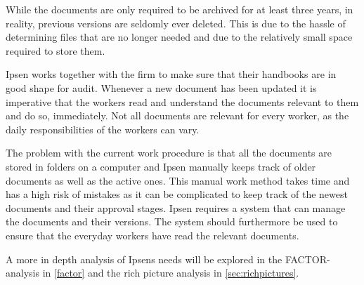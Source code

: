While the documents are only required to be archived for at least three years, in reality, previous versions are seldomly ever deleted.
This is due to the hassle of determining files that are no longer needed and due to the relatively small space required to store them.

Ipsen works together with the firm to make sure that their handbooks are in good shape for audit.
Whenever a new document has been updated it is imperative that the workers read and understand the documents relevant to them and do so, immediately.
Not all documents are relevant for every worker, as the daily responsibilities of the workers can vary.

The problem with the current work procedure is that all the documents are stored in folders on a computer and Ipsen manually keeps track of older documents as well as the active ones.
This manual work method takes time and has a high risk of mistakes as it can be complicated to keep track of the newest documents and their approval stages.
Ipsen requires a system that can manage the documents and their versions.
The system should furthermore be used to ensure that the everyday workers have read the relevant documents.

A more in depth analysis of Ipsens needs will be explored in the FACTOR-analysis in \cref{factor} and the rich picture analysis in \cref{sec:richpictures}.

